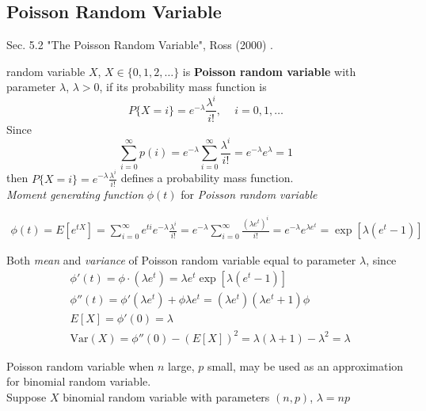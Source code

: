 \documentclass[10pt]{amsart}
\begin{document}
\begin{multicols*}{2}
\subsection{Poisson Random Variable}

Sec. 5.2 "The Poisson Random Variable", Ross (2000) \cite{Ross2000}.

random variable $X$, $X \in \lbrace 0, 1, 2, \dots \rbrace$ is \textbf{Poisson random variable} with parameter $\lambda$, $\lambda > 0$, if its probability mass function is 
\begin{equation}
P \lbrace X = i \rbrace = e^{-\lambda} \frac{\lambda^i }{ i!}, \quad \, i = 0, 1, \dots
\end{equation}
Since 
\[
\sum_{i=0}^{\infty} p(i) = e^{-\lambda} \sum_{i=0}^{\infty} \frac{\lambda^i}{i!} = e^{-\lambda} e^{\lambda} = 1
\]
then $P\lbrace X = i \rbrace = e^{-\lambda} \frac{ \lambda^i}{i!}$ defines a probability mass function. \\

\emph{Moment generating function} $\phi(t)$ for \emph{Poisson random variable}

\begin{equation}
	\begin{gathered}
		\phi(t) = E[e^{tX}] = \sum_{i=0}^{\infty} e^{ti} e^{-\lambda} \frac{\lambda^i}{i!} = e^{-\lambda} \sum_{i=0}^{\infty} \frac{ (\lambda e^t)^i }{ i!} = e^{-\lambda} e^{\lambda e^t} = \exp{ [ \lambda ( e^t - 1 )]}
	\end{gathered}
\end{equation}

Both \emph{mean} and \emph{variance} of Poisson random variable equal to parameter $\lambda$, since
\[
\begin{aligned}
	& \phi'(t) = \phi \cdot (\lambda e^t) = \lambda e^t \exp{ [\lambda ( e^t - 1)]} \\
	& \phi''(t) = \phi' (\lambda e^t ) + \phi \lambda e^t = (\lambda e^t) (\lambda e^t + 1 ) \phi \\
	& E[X] = \phi'(0) = \lambda \\
	& \text{Var}(X) = \phi''(0) - (E[X])^2 = \lambda ( \lambda + 1 ) - \lambda^2 = \lambda
\end{aligned}
\]

Poisson random variable when $n$ large, $p$ small, may be used as an approximation for binomial random variable. \\
Suppose $X$ binomial random variable with parameters $(n, p)$, $\lambda = np$


\end{multicols*}
\end{document}
